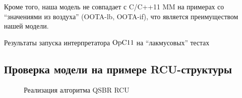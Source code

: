 Кроме того, наша модель не совпадает с C/C++11 MM на примерах со ``значениями из воздуха''
(\textrm{OOTA-lb}, \textrm{OOTA-if}), что является преимуществом нашей модели.


\begin{table}
\centering
{%
 \small
 
}
\caption{Результаты запуска интерпретатора $\mathrm{OpC11}$ на ``лакмусовых'' тестах}
\label{fig:litmusTbl}
\end{table}


\subsection{Проверка модели на примере RCU-структуры}
\label{sec:opc11:rcu}

\begin{figure*}

\caption[Реализация алгоритма QSBR RCU]
{Реализация алгоритма QSBR RCU}
\label{fig:rcuProg} \end{figure*}

